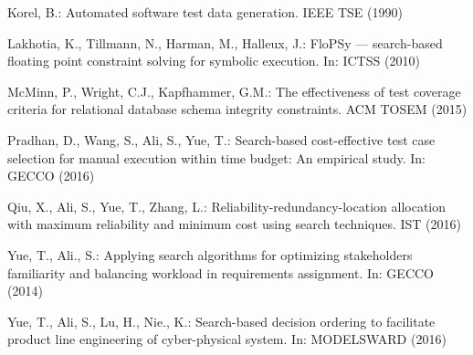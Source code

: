 \documentclass{llncs}
\begin{document}
\begin{thebibliography}{10}
Korel, B.: Automated software test data generation. IEEE TSE  (1990)

Lakhotia, K., Tillmann, N., Harman, M., Halleux, J.: {FloPSy} --- search-based
    floating point constraint solving for symbolic execution. In: ICTSS (2010)

McMinn, P., Wright, C.J., Kapfhammer, G.M.: The effectiveness of test coverage
    criteria for relational database schema integrity constraints. ACM TOSEM
    (2015)

Pradhan, D., Wang, S., Ali, S., Yue, T.: Search-based cost-effective test case
    selection for manual execution within time budget: An empirical study. In:
    GECCO (2016)

Qiu, X., Ali, S., Yue, T., Zhang, L.: Reliability-redundancy-location
    allocation with maximum reliability and minimum cost using search techniques.
    IST  (2016)

Yue, T., Ali., S.: Applying search algorithms for optimizing stakeholders
    familiarity and balancing workload in requirements assignment. In: GECCO
    (2014)

Yue, T., Ali, S., Lu, H., Nie., K.: Search-based decision ordering to
    facilitate product line engineering of cyber-physical system. In: MODELSWARD
    (2016)

\end{thebibliography}
\end{document}
